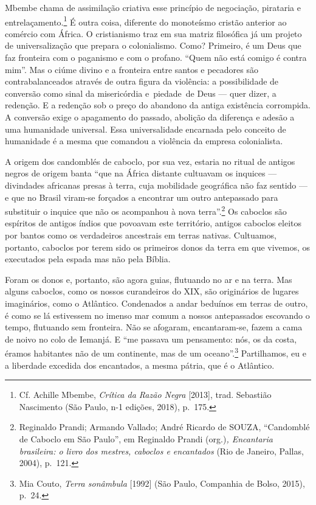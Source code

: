 Mbembe chama de assimilação criativa esse princípio de negociação,
pirataria e entrelaçamento.\footnote{Cf. Achille Mbembe, \textit{Crítica
  da Razão Negra} {[}2013{]}, trad. Sebastião Nascimento (São Paulo, n-1
  edições, 2018), p.~175.} É outra coisa, diferente do monoteísmo
cristão anterior ao comércio com África. O cristianismo traz em sua
matriz filosófica já um projeto de universalização que prepara o
colonialismo. Como? Primeiro, é um Deus que faz fronteira com o
paganismo e com o profano. ``Quem não está comigo é contra mim''. Mas o
ciúme divino e a fronteira entre santos e pecadores são
contrabalanceados através de outra figura da violência: a possibilidade
de conversão como sinal da misericórdia e~piedade~de Deus --- quer dizer,
a redenção. E a redenção sob o preço do abandono da antiga existência
corrompida. A conversão exige o apagamento do passado, abolição da
diferença e adesão a uma humanidade universal. Essa universalidade
encarnada pelo conceito de humanidade é a mesma que comandou a violência
da empresa colonialista.

A origem dos candomblés de caboclo, por sua vez, estaria no ritual de
antigos negros de origem banta ``que na África distante cultuavam os
inquices --- divindades africanas presas à terra, cuja mobilidade
geográfica não faz sentido --- e que no Brasil viram-se forçados a
encontrar um outro antepassado para substituir o inquice que não os
acompanhou à nova terra''.\footnote{Reginaldo Prandi; Armando Vallado;
  André Ricardo de SOUZA, ``Candomblé de Caboclo em São Paulo'', em
  Reginaldo Prandi (org.)\textit{, Encantaria brasileira: o livro dos
  mestres, caboclos e encantados} (Rio de Janeiro, Pallas, 2004),
  p.~121.} Os caboclos são espíritos de antigos índios que povoavam este
território, antigos caboclos eleitos por bantos como os verdadeiros
ancestrais em terras nativas. Cultuamos, portanto, caboclos por terem
sido os primeiros donos da terra em que vivemos, os executados pela
espada mas não pela Bíblia.

Foram os donos e, portanto, são agora guias, flutuando no ar e na terra.
Mas alguns caboclos, como os nossos curandeiros do XIX, são originários
de lugares imaginários, como o Atlântico. Condenados a andar beduínos em
terras de outro, é como se lá estivessem no imenso mar comum a nossos
antepassados escovando o tempo, flutuando sem fronteira. Não se
afogaram, encantaram-se, fazem a cama de noivo no colo de Iemanjá. E
``me passava um pensamento: nós, os da costa, éramos habitantes não de
um continente, mas de um oceano''.\footnote{Mia Couto, \textit{Terra
  sonâmbula} {[}1992{]} (São Paulo, Companhia de Bolso, 2015), p.~24.}
Partilhamos, eu e a liberdade excedida dos encantados, a mesma pátria,
que é o Atlântico.

